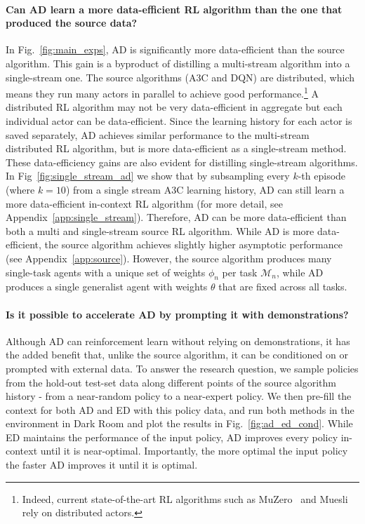\documentclass{article}
\theoremstyle{thm}
\newcommand{\name}{AD }
\begin{document}
\paragraph{Can AD learn a more data-efficient RL algorithm than the one that produced the source data?} In Fig.~\ref{fig:main_exps}, \name is significantly more data-efficient than the source algorithm. This gain is a byproduct of distilling a multi-stream algorithm into a single-stream one. The source algorithms (A3C and DQN) are distributed, which means they run many actors in parallel to achieve good performance.\footnote{Indeed, current state-of-the-art RL algorithms such as MuZero~\citep{sch19muzero} and Muesli~\citep{hessel21muesli} rely on distributed actors.}  A distributed RL algorithm may not be very data-efficient in aggregate but each individual actor can be data-efficient. Since the learning history for each actor is saved separately, \name achieves similar performance to the multi-stream distributed RL algorithm, but is more data-efficient as a single-stream method.
These data-efficiency gains are also evident for distilling single-stream algorithms.
In Fig~\ref{fig:single_stream_ad} we show that by subsampling every $k$-th episode (where $k=10$) from a single stream A3C learning history, \name can still learn a more data-efficient in-context RL algorithm (for more detail, see Appendix~\ref{app:single_stream}). Therefore, \name can be more data-efficient than both a multi and single-stream source RL algorithm.
While \name is more data-efficient, the source algorithm achieves slightly higher asymptotic performance (see Appendix~\ref{app:source}). However, the source algorithm produces many single-task agents with a unique set of weights $\phi_n$ per task $\mathcal M_n$, while \name produces a single generalist agent with weights $\theta$ that are fixed across all tasks.
\vspace{-2mm}
\paragraph{Is it possible to accelerate AD by prompting it with demonstrations?}
Although \name can reinforcement learn without relying on demonstrations, it has the added benefit that, unlike the source algorithm, it can be conditioned on or prompted with external data.
To answer the research question, we sample policies from the hold-out test-set data along different points of the source algorithm history - from a near-random policy to a near-expert policy. We then pre-fill the context for both \name and ED with this policy data, and run both methods in the environment in Dark Room  and plot the results in Fig.~\ref{fig:ad_ed_cond}.
While ED maintains the performance of the input policy, \name improves every policy in-context until it is near-optimal. Importantly, the more optimal the input policy the faster \name improves it until it is optimal.
\vspace{-2mm}
\end{document}
